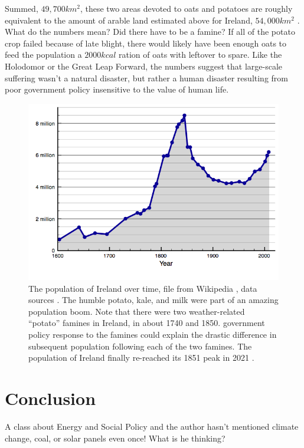 \documentclass[prb,preprint]{revtex4-2}
\begin{document}
Summed, $49,700km^2$, these two areas devoted to oats and potatoes are roughly equivalent to the amount of arable land estimated above for Ireland, $54,000km^2$ \cite{arable_percentage}.  What do the numbers mean?  Did there have to be a famine?  If all of the potato crop failed because of late blight, there would likely have been enough oats to feed the population a $2000kcal$ ration of oats with leftover to spare.  
Like the Holodomor or the Great Leap Forward, the numbers suggest that large-scale suffering wasn't  a natural disaster, but rather a human disaster resulting from poor government policy insensitive to the value of human life.    



\begin{figure}[ht!]
\centering
\includegraphics[width=\columnwidth]{Population_of_Ireland_since_1600.png}
\caption{
The population of Ireland over time, file from Wikipedia \cite{pop_image}, data sources \cite{pop_sources}. The humble potato, kale, and milk were part of an amazing population boom.  Note that there were two weather-related ``potato'' famines in Ireland, in about 1740 and 1850.  government policy response to the famines could explain the drastic difference in subsequent population following each of the two famines.  The population of Ireland finally re-reached its 1851 peak in 2021 \cite{Ireland_5M}.  
}
\label{ireland_population}
\end{figure}


\section{Conclusion}
A class about Energy and Social Policy and the author hasn't mentioned climate change, coal, or solar panels even once!  What is he thinking?  
\end{document}
